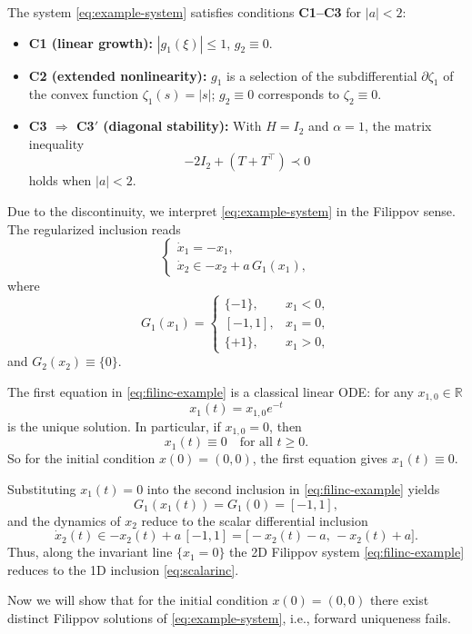 \documentclass[journal]{IEEEtran}
\begin{document}
The system \eqref{eq:example-system} satisfies conditions \textbf{C1--C3} for $|a|<2$:
\begin{itemize}
\item \textbf{C1 (linear growth):} $|g_{1}(\xi)|\leq 1$, $g_{2}\equiv 0$.
\item \textbf{C2 (extended nonlinearity):} $g_{1}$ is a selection of the subdifferential $\partial\zeta_{1}$ of the convex function $\zeta_{1}(s)=|s|$; $g_{2}\equiv 0$ corresponds to $\zeta_{2}\equiv 0$.
\item \textbf{C3 $\Rightarrow$ C3$'$ (diagonal stability):} With $H=I_{2}$ and $\alpha=1$, the matrix inequality
\[
-2I_{2}+(T+T^{\top})\prec 0
\]
holds when $|a|<2$.
\end{itemize}

Due to the discontinuity, we interpret \eqref{eq:example-system} in the Filippov sense. The regularized inclusion reads
\begin{equation}\label{eq:filinc-example}
\begin{cases}
\dot{x}_{1}=-x_{1},\\
\dot{x}_{2}\in -x_{2}+a\,G_{1}(x_{1}),
\end{cases}
\end{equation}
where 
\[
G_{1}(x_{1})=
\begin{cases}
\{-1\},&x_{1}<0,\\
[-1,1],&x_{1}=0,\\
\{+1\},&x_{1}>0,
\end{cases}
\]
and $G_{2}(x_{2})\equiv\{0\}$.

The first equation in \eqref{eq:filinc-example} is a classical linear ODE: for any $x_{1,0}\in\mathbb{R}$
\[
x_{1}(t)=x_{1,0}e^{-t}
\]
is the unique solution. In particular, if $x_{1,0}=0$, then
\[
x_{1}(t)\equiv 0\quad\text{for all }t\geq 0.
\]
So for the initial condition $x(0)=(0,0)$, the first equation gives $x_{1}(t)\equiv 0$. 

Substituting $x_{1}(t)=0$ into the second inclusion in \eqref{eq:filinc-example} yields
\[
G_{1}(x_{1}(t))=G_{1}(0)=[-1,1],
\]
and the dynamics of $x_{2}$ reduce to the scalar differential inclusion
\begin{equation}\label{eq:scalarinc}
\dot{x}_{2}(t)\in -x_{2}(t)+a\,[-1,1]=\bigl[-x_{2}(t)-a,\,-x_{2}(t)+a\bigr].
\end{equation}
Thus, along the invariant line $\{x_{1}=0\}$ the 2D Filippov system \eqref{eq:filinc-example} reduces to the 1D inclusion \eqref{eq:scalarinc}.

Now we will show that for the initial condition $x(0)=(0,0)$ there exist distinct Filippov solutions of \eqref{eq:example-system}, i.e., forward uniqueness fails.
\end{document}
